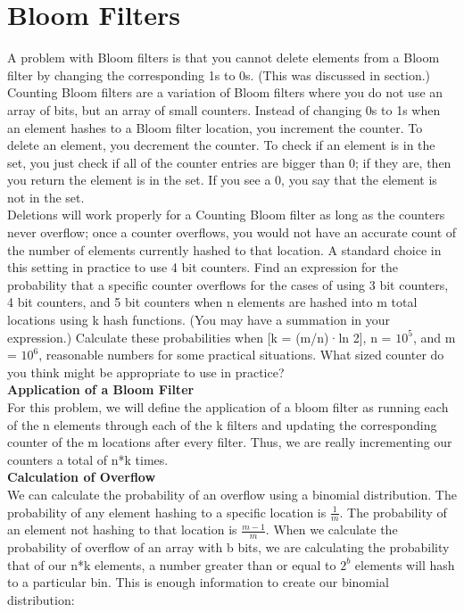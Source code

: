 \documentclass[11pt, solution, letterpaper]{format}
\begin{document}
\section{Bloom Filters}
A problem with Bloom filters is that you cannot delete elements from a Bloom filter by changing the corresponding 1s to 0s. (This was discussed in section.) Counting Bloom filters are a variation of Bloom filters
where you do not use an array of bits, but an array of small counters. Instead of changing 0s to 1s when an
element hashes to a Bloom filter location, you increment the counter. To delete an element, you decrement the
counter. To check if an element is in the set, you just check if all of the counter entries are bigger than 0; if
they are, then you return the element is in the set. If you see a 0, you say that the element is not in the set.\\
Deletions will work properly for a Counting Bloom filter as long as the counters never overflow; once a counter
overflows, you would not have an accurate count of the number of elements currently hashed to that location.
A standard choice in this setting in practice to use 4 bit counters. Find an expression for the probability that
a specific counter overflows for the cases of using 3 bit counters, 4 bit counters, and 5 bit counters when
n elements are hashed into m total locations using k hash functions. (You may have a summation in your
expression.) Calculate these probabilities when [k = (m/n)·ln 2], n = $10^5$, and m = $10^6$, reasonable numbers
for some practical situations. What sized counter do you think might be appropriate to use in practice?\\

\textbf{Application of a Bloom Filter}\\
For this problem, we will define the application of a bloom filter as running each of the n elements through each of the k filters and updating the corresponding counter of the m locations after every filter. Thus, we are really incrementing our counters a total of n*k times.\\

\textbf{Calculation of Overflow}\\
We can calculate the probability of an overflow using a binomial distribution. The probability of any element hashing to a specific location is $\frac{1}{m}$. The probability of an element not hashing to that location is $\frac{m - 1}{m}$.  When we calculate the probability of overflow of an array with b bits, we are calculating the probability that of our n*k elements, a number greater than or equal to $2^b$ elements will hash to a particular bin. This is enough information to create our binomial distribution:\\
\end{document}
